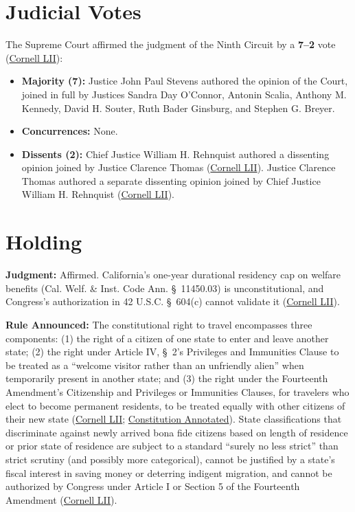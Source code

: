\documentclass[12pt]{article}
\begin{document}
\section{Judicial Votes}

The Supreme Court affirmed the judgment of the Ninth Circuit by a \textbf{7--2} vote (\href{https://www.law.cornell.edu/supremecourt/text/98-97}{Cornell LII}):
\begin{itemize}
\item \textbf{Majority (7):} Justice John Paul Stevens authored the opinion of the Court, joined in full by Justices Sandra Day O'Connor, Antonin Scalia, Anthony M. Kennedy, David H. Souter, Ruth Bader Ginsburg, and Stephen G. Breyer.
\item \textbf{Concurrences:} None.
\item \textbf{Dissents (2):} Chief Justice William H. Rehnquist authored a dissenting opinion joined by Justice Clarence Thomas (\href{https://www.law.cornell.edu/supct/html/98-97.ZD.html}{Cornell LII}). Justice Clarence Thomas authored a separate dissenting opinion joined by Chief Justice William H. Rehnquist (\href{https://www.law.cornell.edu/supct/html/98-97.ZD1.html}{Cornell LII}).
\end{itemize}

\section{Holding}

\textbf{Judgment:} Affirmed. California's one-year durational residency cap on welfare benefits (Cal. Welf. \& Inst. Code Ann. \S~11450.03) is unconstitutional, and Congress's authorization in 42 U.S.C. \S~604(c) cannot validate it (\href{https://www.law.cornell.edu/supremecourt/text/98-97}{Cornell LII}).

\textbf{Rule Announced:} The constitutional right to travel encompasses three components: (1) the right of a citizen of one state to enter and leave another state; (2) the right under Article IV, \S~2's Privileges and Immunities Clause to be treated as a ``welcome visitor rather than an unfriendly alien'' when temporarily present in another state; and (3) the right under the Fourteenth Amendment's Citizenship and Privileges or Immunities Clauses, for travelers who elect to become permanent residents, to be treated equally with other citizens of their new state (\href{https://www.law.cornell.edu/supremecourt/text/98-97}{Cornell LII}; \href{https://www.law.cornell.edu/constitution-conan/article-4/section-2/clause-1/right-to-travel-and-privileges-and-immunities-clause}{Constitution Annotated}). State classifications that discriminate against newly arrived bona fide citizens based on length of residence or prior state of residence are subject to a standard ``surely no less strict'' than strict scrutiny (and possibly more categorical), cannot be justified by a state's fiscal interest in saving money or deterring indigent migration, and cannot be authorized by Congress under Article I or Section 5 of the Fourteenth Amendment (\href{https://www.law.cornell.edu/supremecourt/text/98-97}{Cornell LII}).
\end{document}
